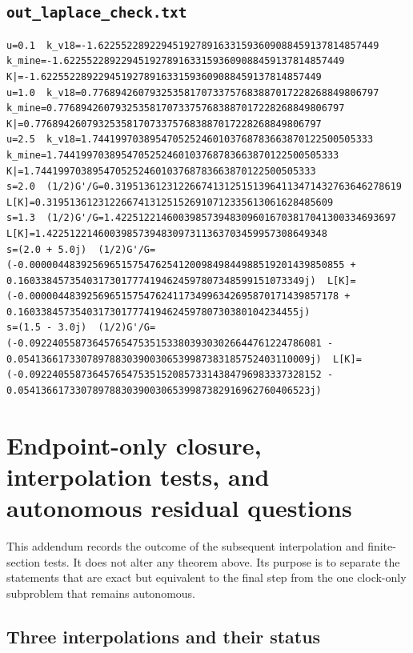 \documentclass[11pt,reqno]{amsart}
\numberwithin{equation}{section}
\theoremstyle{plain}
\theoremstyle{definition}
\theoremstyle{remark}
\begin{document}
\subsection{\texttt{out\_laplace\_check.txt}}
\label{app:out-routeB-laplace-check}

\begin{lstlisting}[style=out]
u=0.1  k_v18=-1.6225522892294519278916331593609088459137814857449  k_mine=-1.6225522892294519278916331593609088459137814857449  K|=-1.6225522892294519278916331593609088459137814857449
u=1.0  k_v18=0.77689426079325358170733757683887017228268849806797  k_mine=0.77689426079325358170733757683887017228268849806797  K|=0.77689426079325358170733757683887017228268849806797
u=2.5  k_v18=1.7441997038954705252460103768783663870122500505333  k_mine=1.7441997038954705252460103768783663870122500505333  K|=1.7441997038954705252460103768783663870122500505333
s=2.0  (1/2)G'/G=0.31951361231226674131251513964113471432763646278619  L[K]=0.31951361231226674131251526910712335613061628485609
s=1.3  (1/2)G'/G=1.4225122146003985739483096016703817041300334693697  L[K]=1.4225122146003985739483097311363703459957308649348
s=(2.0 + 5.0j)  (1/2)G'/G=(-0.0000044839256965157547625412009849844988519201439850855 + 0.16033845735403173017774194624597807348599151073349j)  L[K]=(-0.000004483925696515754762411734996342695870171439857178 + 0.1603384573540317301777419462459780730380104234455j)
s=(1.5 - 3.0j)  (1/2)G'/G=(-0.092240558736457654753515338039303026644761224786081 - 0.054136617330789788303900306539987383185752403110009j)  L[K]=(-0.092240558736457654753515208573314384796983337328152 - 0.054136617330789788303900306539987382916962760406523j)
\end{lstlisting}

\section{Endpoint-only closure, interpolation tests, and autonomous residual questions}\label{sec:appendix-endpoint-v18}
\label{sec:v18-addendum}

This addendum records the outcome of the subsequent interpolation and finite-section tests.  It does not alter any theorem above.  Its purpose is to separate the statements that are exact but equivalent to the final step from the one clock-only subproblem that remains autonomous.

\subsection{Three interpolations and their status}\label{subsec:three-interpolations-v18}
\end{document}
